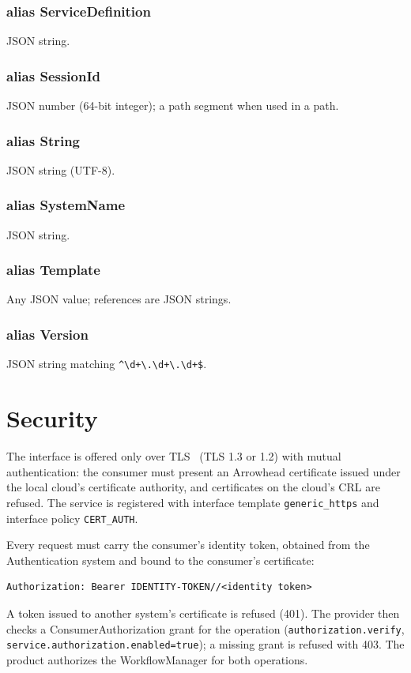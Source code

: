 \documentclass[a4paper]{arrowhead}
\newcommand{\pdef}[1]{{\textcolor{ArrowheadGrey}{#1\label{sec:model:primitives:#1}\label{sec:model:primitives:#1s}}}}
\begin{document}
\subsubsection*{alias \pdef{ServiceDefinition}}
JSON string.

\subsubsection*{alias \pdef{SessionId}}
JSON number (64-bit integer); a path segment when used in a path.

\subsubsection*{alias \pdef{String}}
JSON string (UTF-8).

\subsubsection*{alias \pdef{SystemName}}
JSON string.

\subsubsection*{alias \pdef{Template}}
Any JSON value; references are JSON strings.

\subsubsection*{alias \pdef{Version}}
JSON string matching \texttt{\^{}\textbackslash{}d+\textbackslash{}.\textbackslash{}d+\textbackslash{}.\textbackslash{}d+\$}.



\section{Security}
\label{sec:security}
The interface is offered only over TLS~\cite{rfc8446} (TLS 1.3 or 1.2) with mutual authentication: the consumer must
present an Arrowhead certificate issued under the local cloud's certificate authority, and certificates on the
cloud's CRL are refused. The service is registered with interface template \texttt{generic\_https} and interface
policy \texttt{CERT\_AUTH}.

Every request must carry the consumer's identity token, obtained from the Authentication system and bound to the
consumer's certificate:
\begin{lstlisting}
Authorization: Bearer IDENTITY-TOKEN//<identity token>
\end{lstlisting}
A token issued to another system's certificate is refused (401). The provider then checks a ConsumerAuthorization
grant for the operation (\texttt{authorization.verify}, \texttt{service.authorization.enabled=true}); a missing grant is
refused with 403. The product authorizes the WorkflowManager for both operations.
\end{document}
